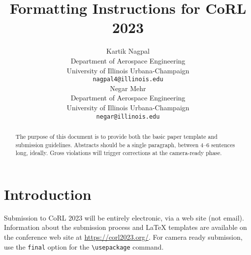 \documentclass{article}
\title{Formatting Instructions for CoRL 2023}
\author{
  Kartik Nagpal\\
  Department of Aerospace Engineering\\
  University of Illinois Urbana-Champaign\\
  \texttt{nagpal4@illinois.edu} \\
  \And
  Negar Mehr \\
  Department of Aerospace Engineering\\
  University of Illinois Urbana-Champaign\\
  \texttt{negar@illinois.edu} \\
}
\begin{document}
\maketitle


\begin{abstract}
    The purpose of this document is to provide both the basic paper template and submission guidelines. Abstracts should be a single paragraph, between 4--6 sentences long, ideally. Gross violations will trigger corrections at the camera-ready phase.
\end{abstract}



\section{Introduction}
	
    Submission to CoRL 2023 will be entirely electronic, via a web site (not email). Information about the submission process and \LaTeX{} templates are available on the conference web site at \url{https://corl2023.org/}. For camera ready submission, use the \texttt{final} option for the \texttt{\textbackslash usepackage} command. 

\end{document}
